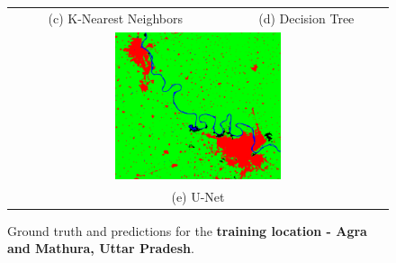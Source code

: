 \documentclass[12pt, a4paper]{report}
\begin{document}
\begin{figure}
\begin{center}
\begin{tabular}{cc}
(c) K-Nearest Neighbors & (d) Decision Tree \\[6pt]
\multicolumn{2}{c}{\includegraphics[width=0.45\textwidth]{train_cnn} }\\
\multicolumn{2}{c}{(e) U-Net}
\end{tabular}
\caption{Ground truth and predictions for the \textbf{training location - Agra and Mathura, Uttar Pradesh}.}
\end{center}
\end{figure}
\end{document}
